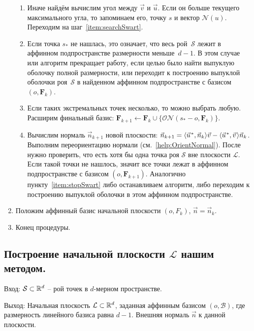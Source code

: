 \documentclass[a4paper,12pt]{article}
\newcommand{\R}[1][]{%
  \ifthenelse{\equal{#1}{}}%
  {\mathbb{R}}%
  {\mathbb{R}^{#1}}}
\newcommand{\Swarm}{\mathcal{S}}              %
\newcommand{\Basis}{\mathcal{B}}              %
\newcommand{\set}[2][]{#1\{ #2 #1\}}                    %
\newcommand{\scalprod}[3][]{#1\langle #2, #3 #1\rangle} %
\newcommand{\Norm}[2][]{\mathcal{N}#1( #2 #1)} %
\newcommand{\ONorm}[3][]{\mathcal{ON}#1( #2, #3 #1)} %
\newcommand{\FinalVec}{\mathbf{F}} %
\newcommand{\Plane}{\mathcal{L}}           %
\renewcommand{\.}{\hspace{0.2ex}}
\begin{document}
\begin{enumerate}
\begin{enumerate}
        \item Иначе найдём вычислим угол между $\vec v$ и $\vec u$. Если он больше текущего максимального угла, то запоминаем его, точку $s$ и вектор $\Norm{u}$. Переходим на шаг~\ref{item:searchSwart}.


        \item Если точка $s_*$ не нашлась, это означает, что весь рой~$\Swarm$ лежит в аффинном подпространстве размерности меньше~$d-1$. В этом случае или алгоритм прекращает работу, если целью было найти выпуклую оболочку полной размерности, или переходит к построению выпуклой оболочки роя~$\Swarm$ в найденном аффинном подпространстве с базисом $(o, \FinalVec_k)$.
        \label{item:stopSwart}


        \item  Если таких экстремальных точек несколько, то можно выбрать любую. Расширим финальный базис: $\FinalVec_{k+1} \leftarrow \FinalVec_k \cup \set[\big]{\ONorm{s_* - o}{\FinalVec_k}}$.


        \item Вычислим нормаль $\vec n_{k+1}$ новой плоскости: $\vec n_{k+1} = \scalprod{\vec u\.^*}{\vec n_k}\vec v - \scalprod{\vec u\.^*}{\vec v \.}\vec n_k$. Выполним переориентацию нормали (см.~\ref{help:OrientNormal}). После нужно проверить, что есть хотя бы одна точка роя $\Swarm$ вне плоскости $\Plane$. Если такой точки не нашлось, значит все точки лежат в аффинном подпространстве с базисом $(o, \FinalVec_{k+1})$. Аналогично пункту~\ref{item:stopSwart} либо останавливаем алгоритм, либо переходим к построению выпуклой оболочки в этом аффинном подпространстве.


      \end{enumerate}


      \item Положим аффинный базис начальной плоскости $(o, F_k)$, $\vec n = \vec n_k$.

      \item Конец процедуры.
    \end{enumerate}

  \subsection{Построение начальной плоскости $\Plane$ нашим методом.}
    \label{subsec:InitialPlaneUs}

    Вход: $\Swarm \subset \R[d]$ -- рой точек в $d$-мерном пространстве.

    Выход: Начальная плоскость $\Plane \subset \R[d]$, заданная аффинным базисом $(o,\Basis)$, где размерность линейного базиса равна $d-1$. Внешняя нормаль $\vec n$ к данной плоскости.
\end{document}
